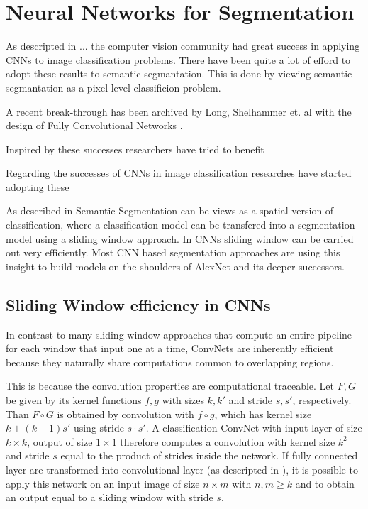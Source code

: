 
\section{Neural Networks for Segmentation}\label{sec:fcn}

As descripted in ... the computer vision community had great success in applying \Glspl{CNN} to image classification problems. There have been quite a lot of efford to adopt these results to semantic segmantation. This is done by viewing semantic segmantation as a pixel-level classificion problem. 

A recent break-through has been archived by Long, Shelhammer et. al with the design of Fully Convolutional Networks \cite{fcn}. 



 Inspired by these successes researchers have tried to benefit 

Regarding the successes of \Glspl{CNN} in image classification researches have started adopting these  



As described in  Semantic Segmentation can be views as a spatial version of classification, where a classification model can be transfered into a segmentation model using a sliding window approach. In \glspl{CNN} sliding window can be carried out very efficiently. Most CNN based segmentation approaches are using this insight to build models on the shoulders of AlexNet and its deeper successors. 

\subsection{Sliding Window efficiency in CNNs}


In contrast to many sliding-window approaches that compute an entire pipeline for each window that input one at a time, ConvNets are inherently efficient because they naturally share computations common to overlapping regions. 


This is because the convolution properties are computational traceable. Let $F, G$ be given by its kernel functions $f,g$ with sizes $k,k'$ and stride $s,s'$, respectively. Than $F \circ G$ is obtained by convolution with $f \circ g$, which has kernel size $k + (k-1) s'$ using stride $s \cdot s'$. A classification ConvNet with input layer of size $k \times k$, output of size $1 \times 1$ therefore computes a convolution with kernel size $k^2$ and stride $s$ equal to the product of strides inside the network. If fully connected layer are transformed into convolutional layer (as descripted in ), it is possible to apply this network on an input image of size $n \times m$ with $n,m \geq k$ and to obtain an output equal to a sliding window with stride $s$. 

